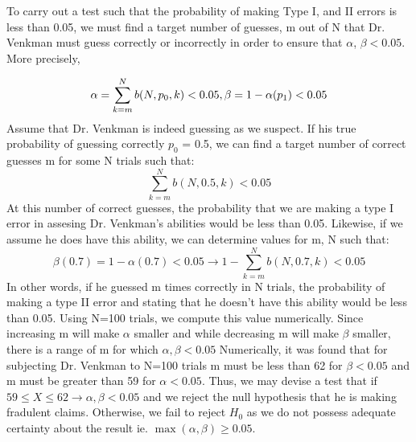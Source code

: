 \documentclass[12pt]{article}
\begin{document}
\begin{flushleft}
To carry out a test such that the probability of making Type I, and II errors is less than 0.05, we must find a target number of guesses, m out of N that Dr. Venkman must guess correctly or incorrectly in order to ensure that $\alpha$, $\beta<0.05$. More precisely, 
\end{flushleft}
\begin{equation*}
    \alpha =  \sum\limits_{k=m}^{N}{b(N, p_0, k)} < 0.05, \beta = 1-\alpha(p_1) < 0.05\\
\end{equation*}
Assume that Dr. Venkman is indeed guessing as we suspect. If his true probability of guessing correctly $p_0$ = 0.5, we can find a target number of correct guesses m for some N trials such that:
\begin{equation*}
    \sum\limits_{k=m}^{N}{b(N, 0.5, k)} < 0.05
\end{equation*}
At this number of correct guesses, the probability that we are making a type I error in assesing Dr. Venkman's abilities would be less than 0.05. Likewise, if we assume he does have this ability, we can determine values for m, N such that:
\begin{equation*}
\beta(0.7) = 1-\alpha(0.7) < 0.05 \rightarrow 1 -  \sum\limits_{k=m}^{N}{b(N, 0.7, k)} < 0.05
\end{equation*}
In other words, if he guessed m times correctly in N trials, the probability of making a type II error and stating that he doesn't have this ability would be less than 0.05. Using N=100 trials, we compute this value numerically. Since increasing m will make $\alpha$ smaller and while decreasing m will make $\beta$ smaller, there is a range of m for which $\alpha, \beta < 0.05$ Numerically, it was found that for subjecting Dr. Venkman to N=100 trials m must be less than 62 for $\beta <0.05$ and m must be greater than 59 for $\alpha <0.05$.
Thus, we may devise a test that if $59 \leq X \leq 62 \rightarrow \alpha, \beta < 0.05$ and we reject the null hypothesis that he is making fradulent claims. Otherwise, we fail to reject $H_0$ as we do not possess adequate certainty about the result ie. $\max(\alpha, \beta) \geq 0.05$.
\end{document}
